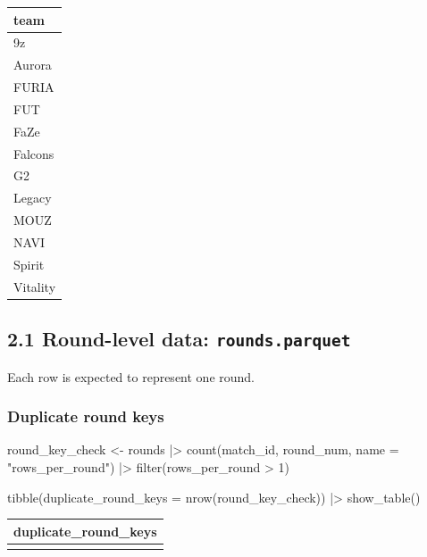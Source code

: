 \documentclass[
  letterpaper,
  DIV=11,
  numbers=noendperiod]{scrartcl}
\newenvironment{Shaded}{\begin{snugshade}}{\end{snugshade}}
\newcommand{\AttributeTok}[1]{\textcolor[rgb]{0.40,0.45,0.13}{#1}}
\newcommand{\DecValTok}[1]{\textcolor[rgb]{0.68,0.00,0.00}{#1}}
\newcommand{\FunctionTok}[1]{\textcolor[rgb]{0.28,0.35,0.67}{#1}}
\newcommand{\NormalTok}[1]{\textcolor[rgb]{0.00,0.23,0.31}{#1}}
\newcommand{\OtherTok}[1]{\textcolor[rgb]{0.00,0.23,0.31}{#1}}
\newcommand{\SpecialCharTok}[1]{\textcolor[rgb]{0.37,0.37,0.37}{#1}}
\newcommand{\StringTok}[1]{\textcolor[rgb]{0.13,0.47,0.30}{#1}}
\newcounter{none} %
\begin{document}
{\def\LTcaptype{none} %
\begin{longtable}[]{@{}l@{}}
\toprule\noalign{}
team \\
\midrule\noalign{}
\endhead
\bottomrule\noalign{}
\endlastfoot
9z \\
Aurora \\
FURIA \\
FUT \\
FaZe \\
Falcons \\
G2 \\
Legacy \\
MOUZ \\
NAVI \\
Spirit \\
Vitality \\
\end{longtable}
}

\subsection{\texorpdfstring{2.1 Round-level data:
\texttt{rounds.parquet}}{2.1 Round-level data: rounds.parquet}}\label{round-level-data-rounds.parquet}

Each row is expected to represent one round.

\subsubsection{Duplicate round keys}\label{duplicate-round-keys}

\begin{Shaded}
\begin{Highlighting}[]
\NormalTok{round\_key\_check }\OtherTok{\textless{}{-}}\NormalTok{ rounds }\SpecialCharTok{|\textgreater{}}
  \FunctionTok{count}\NormalTok{(match\_id, round\_num, }\AttributeTok{name =} \StringTok{"rows\_per\_round"}\NormalTok{) }\SpecialCharTok{|\textgreater{}}
  \FunctionTok{filter}\NormalTok{(rows\_per\_round }\SpecialCharTok{\textgreater{}} \DecValTok{1}\NormalTok{)}

\FunctionTok{tibble}\NormalTok{(}\AttributeTok{duplicate\_round\_keys =} \FunctionTok{nrow}\NormalTok{(round\_key\_check)) }\SpecialCharTok{|\textgreater{}} \FunctionTok{show\_table}\NormalTok{()}
\end{Highlighting}
\end{Shaded}

{\def\LTcaptype{none} %
\begin{longtable}[]{@{}r@{}}
\toprule\noalign{}
duplicate\_round\_keys \\
\midrule\noalign{}
\endhead
\bottomrule\noalign{}
\endlastfoot
0 \\
\end{longtable}
}
\end{document}
